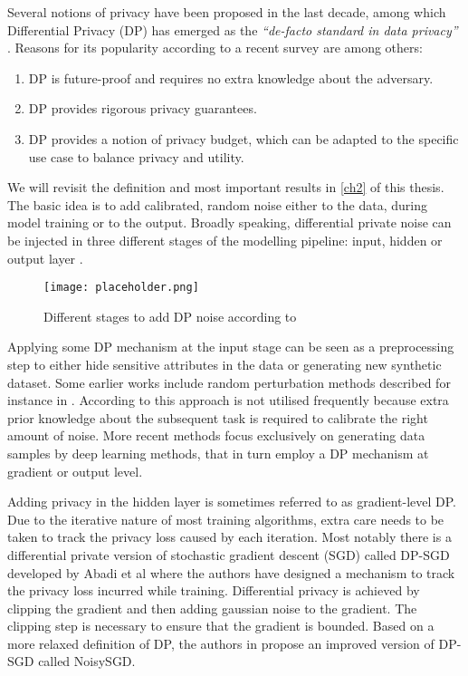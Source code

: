 Several notions of privacy have been proposed in the last decade, among which Differential Privacy (DP) has emerged as the \textit{``de-facto standard in data privacy''} \parencite{kim2021survey}. Reasons for its popularity according to a recent survey \parencite{surv_dp2021} are among others:

\begin{enumerate}
    \item DP is future-proof and requires no extra knowledge about the adversary.
    \item DP provides rigorous privacy guarantees.
    \item DP provides a notion of privacy budget, which can be adapted to the specific use case to balance privacy and utility.
\end{enumerate}

We will revisit the definition and most important results in \cref{ch2} of this thesis. The basic idea is to add calibrated, random noise either to the data, during model training or to the output. Broadly speaking, differential private noise can be injected in three different stages of the modelling pipeline: input, hidden or output layer \parencite[cf.][]{zhao2019differential}. 

\begin{figure}[h]
    \centering
    \texttt{[image: placeholder.png]}
    \caption{Different stages to add DP noise according to \parencite{wang2023differential}}
    \label{fig:enter-label}
\end{figure} 

Applying some DP mechanism at the input stage can be seen as a preprocessing step to either hide sensitive attributes in the data or generating new synthetic dataset. Some earlier works include random perturbation methods described for instance in \parencite{input_levelDP,erm_dp_input}. According to \parencite{wang2023differential} this approach is not utilised frequently because extra prior knowledge about the subsequent task is required to calibrate the right amount of noise. More recent methods focus exclusively on generating data samples by deep learning methods, that in turn employ a DP mechanism at gradient or output level. 

Adding privacy in the hidden layer is sometimes referred to as gradient-level DP. Due to the iterative nature of most training algorithms, extra care needs to be taken to track the privacy loss caused by each iteration. Most notably there is a differential private version of stochastic gradient descent (SGD) called DP-SGD developed by Abadi et al \parencite{Abadi_2016} where the authors have designed a mechanism to track the privacy loss incurred while training. Differential privacy is achieved by clipping the gradient and then adding gaussian noise to the gradient. The clipping step is necessary to ensure that the gradient is bounded. Based on a more relaxed definition of DP, the authors in \parencite{bu2020deep} propose an improved version of DP-SGD called NoisySGD. 

